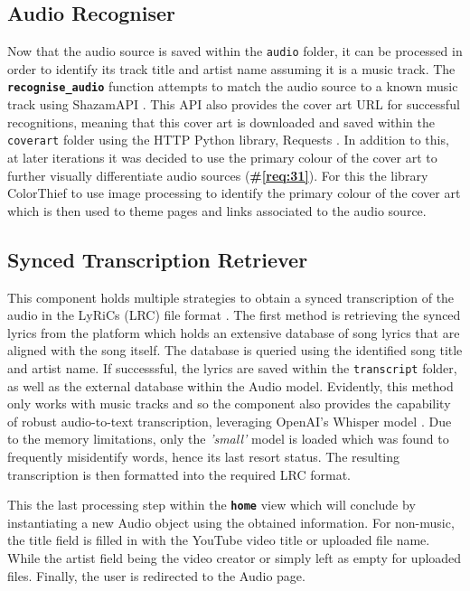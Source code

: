 \documentclass{l4proj}
\begin{document}
\subsection{Audio Recogniser}
Now that the audio source is saved within the \lstinline|audio| folder, it can be processed in order to identify its track title and artist name assuming it is a music track. The \textbf{\lstinline|recognise_audio|} function attempts to match the audio source to a known music track using ShazamAPI \citep{shazamapi}. This API also provides the cover art URL for successful recognitions, meaning that this cover art is downloaded and saved within the \lstinline|coverart| folder using the HTTP Python library, Requests \citep{requests}. In addition to this, at later iterations it was decided to use the primary colour of the cover art to further visually differentiate audio sources (\textbf{\#\ref{req:31}}). For this the library ColorThief \citep{colorthief} to use image processing to identify the primary colour of the cover art which is then used to theme pages and links associated to the audio source.


\subsection{Synced Transcription Retriever}
This component holds multiple strategies to obtain a synced transcription of the audio in the LyRiCs (LRC) file format \citep{lrc}. The first method is retrieving the synced lyrics from the \cite{musixmatch} platform which holds an extensive database of song lyrics that are aligned with the song itself. The database is queried using the identified song title and artist name. If successsful, the lyrics are saved within the \lstinline|transcript| folder, as well as the external database within the Audio model. Evidently, this method only works with music tracks and so the component also provides the capability of robust audio-to-text transcription, leveraging OpenAI's Whisper model \citep{whisper}. Due to the memory limitations, only the \emph{'small'} model is loaded which was found to frequently misidentify words, hence its last resort status.  The resulting transcription is then formatted into the required LRC format.

This the last processing step within the \textbf{\lstinline|home|} view which will conclude by instantiating a new Audio object using the obtained information. For non-music, the title field is filled in with the YouTube video title or uploaded file name. While the artist field being the video creator or simply left as empty for uploaded files. Finally, the user is redirected to the Audio page.
\end{document}
